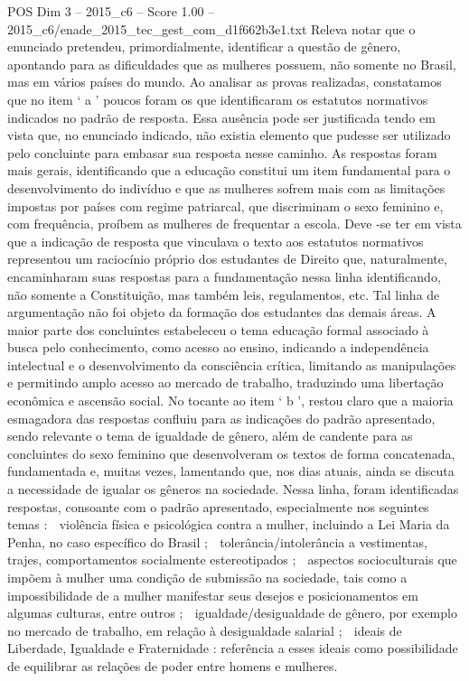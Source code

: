 \begin{textsample}{POS Dim 3 – 2015\_c6 – Score 1.00 – 2015\_c6/enade\_2015\_tec\_gest\_com\_d1f662b3e1.txt}
Releva notar que o enunciado pretendeu, primordialmente, identificar a questão de gênero, apontando para as dificuldades que as mulheres possuem, não somente no Brasil, mas em vários países do mundo.
Ao analisar as provas realizadas, constatamos que no item ‘ a ’ poucos foram os que identificaram os estatutos normativos indicados no padrão de resposta.
Essa ausência pode ser justificada tendo em vista que, no enunciado indicado, não existia elemento que pudesse ser utilizado pelo concluinte para embasar sua resposta nesse caminho.
As respostas foram mais gerais, identificando que a educação constitui um item fundamental para o desenvolvimento do indivíduo e que as mulheres sofrem mais com as limitações impostas por países com regime patriarcal, que discriminam o sexo feminino e, com frequência, proíbem as mulheres de frequentar a escola.
Deve -se ter em vista que a indicação de resposta que vinculava o texto aos estatutos normativos representou um raciocínio próprio dos estudantes de Direito que, naturalmente, encaminharam suas respostas para a fundamentação nessa linha identificando, não somente a Constituição, mas também leis, regulamentos, etc.
Tal linha de argumentação não foi objeto da formação dos estudantes das demais áreas.
A maior parte dos concluintes estabeleceu o tema educação formal associado à busca pelo conhecimento, como acesso ao ensino, indicando a independência intelectual e o desenvolvimento da consciência crítica, limitando as manipulações e permitindo amplo acesso ao mercado de trabalho, traduzindo uma libertação econômica e ascensão social.
No tocante ao item ‘ b ’, restou claro que a maioria esmagadora das respostas confluiu para as indicações do padrão apresentado, sendo relevante o tema de igualdade de gênero, além de candente para as concluintes do sexo feminino que desenvolveram os textos de forma concatenada, fundamentada e, muitas vezes, lamentando que, nos dias atuais, ainda se discuta a necessidade de igualar os gêneros na sociedade.
Nessa linha, foram identificadas respostas, consoante com o padrão apresentado, especialmente nos seguintes temas :  violência física e psicológica contra a mulher, incluindo a Lei Maria da Penha, no caso específico do Brasil ;  tolerância/intolerância a vestimentas, trajes, comportamentos socialmente estereotipados ;  aspectos socioculturais que impõem à mulher uma condição de submissão na sociedade, tais como a impossibilidade de a mulher manifestar seus desejos e posicionamentos em algumas culturas, entre outros ;  igualdade/desigualdade de gênero, por exemplo no mercado de trabalho, em relação à desigualdade salarial ;  ideais de Liberdade, Igualdade e Fraternidade : referência a esses ideais como possibilidade de equilibrar as relações de poder entre homens e mulheres.

\end{textsample}
